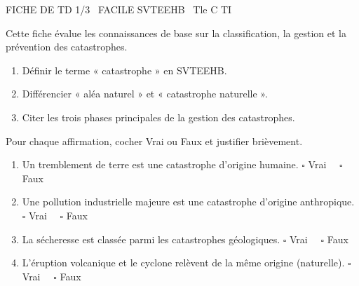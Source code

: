 \documentclass[11pt]{article}
\begin{document}
\begin{tcolorbox}[enhanced,colback=popink,colframe=popink,arc=10pt,boxrule=0pt,left=12pt,right=12pt,top=9pt,bottom=9pt]
{\color{white}\popxbold\small FICHE DE TD 1/3 \textbullet\ FACILE \hfill SVTEEHB \textbullet\ Tle C TI\par}
\end{tcolorbox}
\vspace{4pt}
Cette fiche évalue les connaissances de base sur la classification, la gestion et la prévention des catastrophes.

\begin{exercice}
\begin{enumerate}
    \item Définir le terme « catastrophe » en SVTEEHB.
    \item Différencier « aléa naturel » et « catastrophe naturelle ».
    \item Citer les trois phases principales de la gestion des catastrophes.
\end{enumerate}
\end{exercice}

\begin{exercice}
Pour chaque affirmation, cocher Vrai ou Faux et justifier brièvement.
\begin{enumerate}
    \item Un tremblement de terre est une catastrophe d'origine humaine. \hfill $\square$ Vrai $\quad \square$ Faux
    \item Une pollution industrielle majeure est une catastrophe d'origine anthropique. \hfill $\square$ Vrai $\quad \square$ Faux
    \item La sécheresse est classée parmi les catastrophes géologiques. \hfill $\square$ Vrai $\quad \square$ Faux
    \item L'éruption volcanique et le cyclone relèvent de la même origine (naturelle). \hfill $\square$ Vrai $\quad \square$ Faux
\end{enumerate}
\end{exercice}
\end{document}
